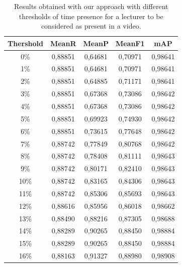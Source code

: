 \begin{table}[!ht]
\small
\centering
\caption{Results obtained with our approach with different thresholds of time presence for a lecturer to be considered as present in a video.}
\label{tab:results}
\begin{tabular}{ccccc}
\hline
\textbf{Thershold} & \textbf{MeanR}  & \textbf{MeanP} & \textbf{MeanF1} &\textbf{mAP} \\ \hline
0\%                & 0,88851         & 0,64681        & 0,70971         & 0,98641   \\
1\%                & 0,88851         & 0,64681        & 0,70971         & 0,98641   \\
2\%                & 0,88851         & 0,64885        & 0,71171         & 0,98641   \\
3\%                & 0,88851         & 0,67368        & 0,73086         & 0,98642   \\
4\%                & 0,88851         & 0,67368        & 0,73086         & 0,98642   \\
5\%                & 0,88851         & 0,69923        & 0,74930         & 0,98642   \\
6\%                & 0,88851         & 0,73615        & 0,77648         & 0,98642   \\
7\%                & 0,88742         & 0,77849        & 0,80768         & 0,98642   \\
8\%                & 0,88742         & 0,78408        & 0,81111         & 0,98643   \\
9\%                & 0,88742         & 0,80171        & 0,82410         & 0,98643   \\
10\%               & 0,88742         & 0,83165        & 0,84306         & 0,98643   \\
11\%               & 0,88742         & 0,85306        & 0,85693         & 0,98643   \\
12\%               & 0,88616         & 0,85956        & 0,86018         & 0,98662   \\
13\%               & 0,88490         & 0,88216        & 0,87305         & 0,98688   \\
14\%               & 0,88289         & 0,90265        & 0,88450         & 0,98884   \\
15\%               & 0,88289         & 0,90265        & 0,88450         & 0,98884   \\
16\%               & 0,88163         & 0,91327        & 0,88980         & 0,98908   \\

\end{tabular}
\end{table}
